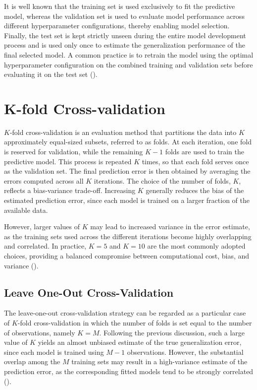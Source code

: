 \documentclass[12pt]{report} %
\begin{document}
It is well known that the training set is used exclusively to fit the predictive model, whereas the validation set is used to evaluate model performance across different hyperparameter configurations, thereby enabling model selection. Finally, the test set is kept strictly unseen during the entire model development process and is used only once to estimate the generalization performance of the final selected model. A common practice is to retrain the model using the optimal hyperparameter configuration on the combined training and validation sets before evaluating it on the test set (\cite{zaki2014data}).


\section{K-fold Cross-validation} \label{sec:k-fold}

$K$-fold cross-validation is an evaluation method that partitions the data into $K$ approximately equal-sized subsets, referred to as folds. At each iteration, one fold is reserved for validation, while the remaining $K-1$ folds are used to train the predictive model. This process is repeated $K$ times, so that each fold serves once as the validation set. The final prediction error is then obtained by averaging the errors computed across all $K$ iterations. The choice of the number of folds, $K$, reflects a bias-variance trade-off. Increasing $K$ generally reduces the bias of the estimated prediction error, since each model is trained on a larger fraction of the available data. 

\newpage

However, larger values of $K$ may lead to increased variance in the error estimate, as the training sets used across the different iterations become highly overlapping and correlated. In practice, $K=5$ and $K=10$ are the most commonly adopted choices, providing a balanced compromise between computational cost, bias, and variance (\cite{kohavi1995study}).



\subsection{Leave One-Out Cross-Validation} \label{subsec:loo}

The leave-one-out cross-validation strategy can be regarded as a particular case of $K$-fold cross-validation in which the number of folds is set equal to the number of observations, namely $K=M$. Following the previous discussion, such a large value of $K$ yields an almost unbiased estimate of the true generalization error, since each model is trained using $M-1$ observations. However, the substantial overlap among the $M$ training sets may result in a high-variance estimate of the prediction error, as the corresponding fitted models tend to be strongly correlated (\cite{hastie2009elements}).
\end{document}
